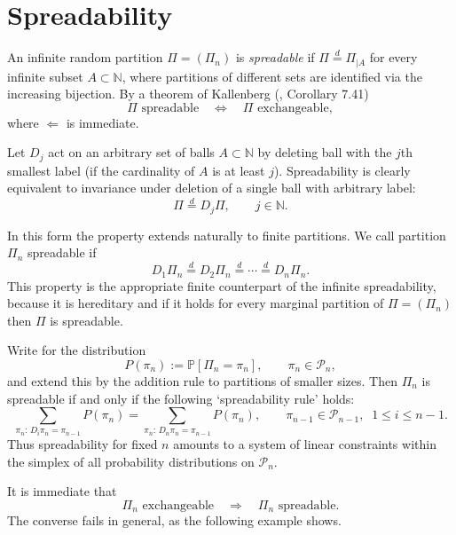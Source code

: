 \documentclass{article}
\begin{document}
\section{Spreadability}
\noindent
An infinite random partition $\Pi=(\Pi_n)$ is {\it spreadable} if
$
\Pi\stackrel{d}{=}\Pi_{|A}
$
for every infinite subset $A\subset{\mathbb N}$,
where partitions of different sets are identified via the increasing
bijection.
By a theorem of Kallenberg (\cite{Kallenberg}, Corollary 7.41)
\[
\Pi \text{  spreadable}
\quad\Longleftrightarrow\quad
\Pi \text{  exchangeable},
\]
where $\Leftarrow$ is immediate.

Let $D_j$ act on an arbitrary set of balls $A\subset {\mathbb N}$ by deleting ball with the $j$th smallest label  (if
the cardinality of $A$ is at least $j$).
Spreadability is clearly equivalent to invariance under deletion of a single
ball with arbitrary label:
\[
\Pi\stackrel{d}{=}D_j\Pi,
\qquad j\in{\mathbb N}.
\]




In this form the property extends naturally to finite partitions.
We call partition $\Pi_n$ spreadable if
\begin{equation}\label{FinSpr}
D_1\Pi_n \stackrel d= D_2\Pi_n \stackrel d=
\cdots \stackrel d= D_n\Pi_n .
\end{equation}
This property is the appropriate finite counterpart of the infinite spreadability,  because it is hereditary and if it holds   for
every marginal partition of $\Pi=(\Pi_n)$  then $\Pi$ is spreadable.

Write for the distribution
\[
P(\pi_n):={\mathbb P}[\Pi_n=\pi_n],
\qquad \pi_n\in{\mathcal P}_n,
\]
and extend this by the addition rule to partitions of smaller sizes.
Then $\Pi_n$ is spreadable if and only if the following   `spreadability rule' holds:
\begin{equation}\label{SprRule}
\sum_{\pi_n:\,D_i\pi_n=\pi_{n-1}} P(\pi_n)
=
\sum_{\pi_n:\,D_n\pi_n=\pi_{n-1}} P(\pi_n),
\qquad
\pi_{n-1}\in{\mathcal P}_{n-1},\;\;1\le i\le n-1 .
\end{equation}
Thus spreadability for fixed $n$  amounts to a system of linear constraints within  the simplex of
all probability distributions on ${\mathcal P}_n$.

It is immediate that
\[
\Pi_n \text{ exchangeable}
\quad\Longrightarrow\quad
\Pi_n \text{ spreadable}.
\]
The converse fails in general, as the following example shows.
\vskip0.2cm
\end{document}
